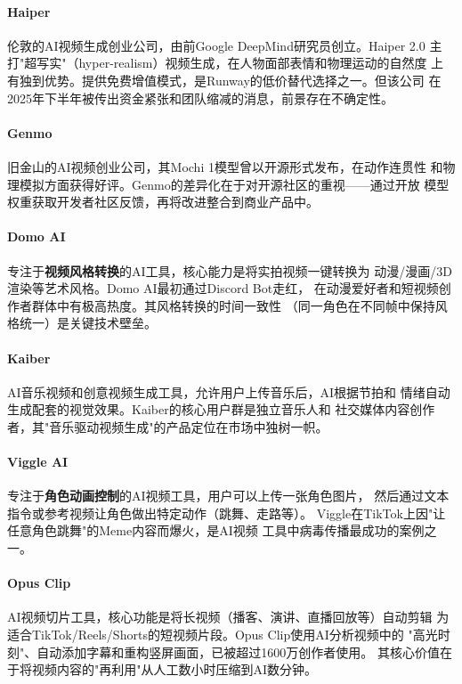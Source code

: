 \paragraph{Haiper}
伦敦的AI视频生成创业公司，由前Google DeepMind研究员创立。Haiper 2.0
主打"超写实"（hyper-realism）视频生成，在人物面部表情和物理运动的自然度
上有独到优势。提供免费增值模式，是Runway的低价替代选择之一。但该公司
在2025年下半年被传出资金紧张和团队缩减的消息，前景存在不确定性。

\paragraph{Genmo}
旧金山的AI视频创业公司，其Mochi 1模型曾以开源形式发布，在动作连贯性
和物理模拟方面获得好评。Genmo的差异化在于对开源社区的重视——通过开放
模型权重获取开发者社区反馈，再将改进整合到商业产品中。

\paragraph{Domo AI}
专注于\textbf{视频风格转换}的AI工具，核心能力是将实拍视频一键转换为
动漫/漫画/3D渲染等艺术风格。Domo AI最初通过Discord Bot走红，
在动漫爱好者和短视频创作者群体中有极高热度。其风格转换的时间一致性
（同一角色在不同帧中保持风格统一）是关键技术壁垒。

\paragraph{Kaiber}
AI音乐视频和创意视频生成工具，允许用户上传音乐后，AI根据节拍和
情绪自动生成配套的视觉效果。Kaiber的核心用户群是独立音乐人和
社交媒体内容创作者，其"音乐驱动视频生成"的产品定位在市场中独树一帜。

\paragraph{Viggle AI}
专注于\textbf{角色动画控制}的AI视频工具，用户可以上传一张角色图片，
然后通过文本指令或参考视频让角色做出特定动作（跳舞、走路等）。
Viggle在TikTok上因"让任意角色跳舞"的Meme内容而爆火，是AI视频
工具中病毒传播最成功的案例之一。

\paragraph{Opus Clip}
AI视频切片工具，核心功能是将长视频（播客、演讲、直播回放等）自动剪辑
为适合TikTok/Reels/Shorts的短视频片段。Opus Clip使用AI分析视频中的
"高光时刻"、自动添加字幕和重构竖屏画面，已被超过1600万创作者使用。
其核心价值在于将视频内容的"再利用"从人工数小时压缩到AI数分钟。

